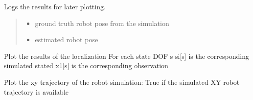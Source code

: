 \documentclass[letterpaper,10pt,english]{sphinxmanual}
\begin{document}
\begin{fulllineitems}
\begin{fulllineitems}
\label{\detokenize{GFLocalization:GFLocalization.GFLocalization.Log}}
\pysigstartsignatures
{}
\pysigstopsignatures
\sphinxAtStartPar
Logs the results for later plotting.
\begin{quote}\begin{description}
\begin{itemize}
\item {} 
\sphinxAtStartPar
{} \textendash{} ground truth robot pose from the simulation

\item {} 
\sphinxAtStartPar
{} \textendash{} estimated robot pose

\end{itemize}

\end{description}\end{quote}

\end{fulllineitems}


\begin{fulllineitems}
\label{\detokenize{GFLocalization:GFLocalization.GFLocalization.PlotState}}
\pysigstartsignatures
{}
\pysigstopsignatures
\sphinxAtStartPar
Plot the results of the localization
For each state DOF s
\sphinxhyphen{}si{[}s{]} is the corresponding simulated stated
\sphinxhyphen{}x1{[}s{]} is the corresponding observation

\end{fulllineitems}


\begin{fulllineitems}
\label{\detokenize{GFLocalization:GFLocalization.GFLocalization.PlotXY}}
\pysigstartsignatures
{}
\pysigstopsignatures
\sphinxAtStartPar
Plot the x\sphinxhyphen{}y trajectory of the robot
simulation: True if the simulated XY robot trajectory is available


\end{fulllineitems}
\end{fulllineitems}
\end{document}
